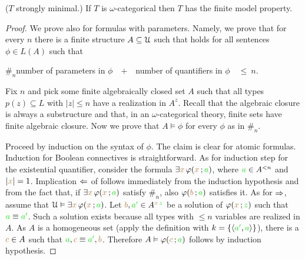 \begin{lemma}\label{lem_zilbergiocattolo} 
  ($T$ strongly minimal.)
  If $T$ is $\omega$-categorical then $T$ has the finite model property.
\end{lemma}
\begin{proof}
  We prove  also for formulas with parameters.
  Namely, we prove that for every $n$ there is a finite structure $A\subseteq\EuScript U$ such that  holds for all sentences $\phi\in L(A)$ such that

  $\#_n$\hfil number of parameters in $\phi$\ \ $+$\ \ number of quantifiers in $\phi$\ \ $\le\ n$.

  Fix $n$ and pick some finite algebraically closed set $A$ such that all types $p(z)\subseteq L$ with $|z|\le n$ have a realization in $A^z$.
  Recall that the algebraic closure is always a substructure and that, in an $\omega$-categorical theory, finite sets have finite algebraic closure. 
  Now we prove that $A\models\phi$ for every $\phi$ as in $\#_n$.

  Proceed by induction on the syntax of $\phi$.
  The claim is clear for atomic formulas.
  Induction for Boolean connectives is straightforward.
  As for induction step for the existential quantifier, consider the formula $\exists {\color{brown}x}\,\varphi({\color{brown} x}\,;{\color{green} a})$, where ${\color{green} a}\in A^{<n}$ and $|{\color{brown} x}|=1$.
  Implication $\Leftarrow$ of  follows immediately from the induction hypothesis and from the fact that, if $\exists {\color{brown}x}\,\varphi({\color{brown} x}\,;{\color{green} a})$ satisfy $\#_n$, also $\varphi({\color{brown} b}\,;{\color{green} a})$ satisfies it.
  As for $\Rightarrow$, assume that $\EuScript U\vDash\exists {\color{brown}x}\, \varphi({\color{brown} x}\,;{\color{green} a})$.
  Let ${\color{brown} b},{\color{green} a'}\in A^{{\color{brown} x}\,{\color{green} z}}$ be a solution of $\varphi({\color{brown} x}\,;{\color{green} z})$ such that ${\color{green} a}\equiv{\color{green}a'}$.
  Such a solution exists because all types with $\le n$ variables are realized in $A$.
  As $A$ is a homogeneous set (apply the definition with $k=\{\langle{\color{green}a'},{\color{green} a}\rangle\}$),  there is a ${\color{brown} c}\in A$ such that ${\color{green} a},{\color{brown} c}\equiv {\color{green}a'},{\color{brown} b}$.
  Therefore $A\vDash\varphi({\color{brown} c}\,;{\color{green} a})$ follows by induction hypothesis.
\end{proof}

